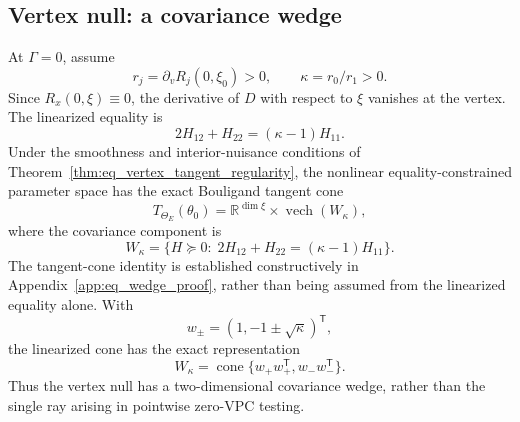 \subsection{Vertex null: a covariance wedge}
\label{subsec:eq_vertex_geometry}
At $\Gamma=0$, assume
\begin{equation}\label{eq:eq_rkappa}
 r_j=\partial_vR_j(0,\xi_0)>0,
 \qquad \kappa=r_0/r_1>0.
\end{equation}
Since $R_x(0,\xi)\equiv0$, the derivative of $D$ with respect
to $\xi$ vanishes at the vertex. The linearized equality is
\begin{equation}\label{eq:eq_linear_vertex}
 2H_{12}+H_{22}=(\kappa-1)H_{11}.
\end{equation}
Under the smoothness and interior-nuisance conditions
of Theorem~\ref{thm:eq_vertex_tangent_regularity},
the nonlinear equality-constrained parameter space
has the exact Bouligand tangent cone
\[
T_{\Theta_E}(\theta_0)
=
\mathbb R^{\dim\xi}
\times\operatorname{vech}(W_\kappa),
\]
where the covariance component is
\begin{equation}\label{eq:eq_wedge}
 W_\kappa=\{H\succeq0:\;
 2H_{12}+H_{22}=(\kappa-1)H_{11}\}.
\end{equation}
The tangent-cone identity is established constructively
in Appendix~\ref{app:eq_wedge_proof}, rather than
being assumed from the linearized equality alone.
With
\begin{equation}\label{eq:eq_wpm}
 w_\pm=(1,-1\pm\sqrt\kappa)^{\mathsf T},
\end{equation}
the linearized cone has the exact representation
\begin{equation}\label{eq:eq_wedge_generators}
 W_\kappa=\operatorname{cone}
 \{w_+w_+^{\mathsf T},w_-w_-^{\mathsf T}\}.
\end{equation}
Thus the vertex null has a two-dimensional covariance wedge,
rather than the single ray arising in pointwise zero-VPC testing.

